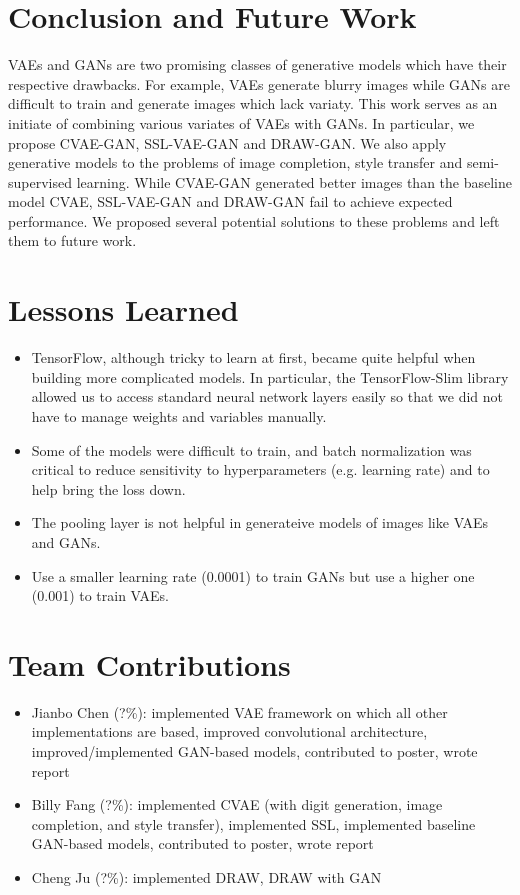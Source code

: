 \documentclass[10pt]{article}
\begin{document}
\section{Conclusion and Future Work}
VAEs and GANs are two promising classes of generative models which have their respective drawbacks. For example, VAEs generate blurry images while GANs are difficult to train and generate images which lack variaty. This work serves as an initiate of combining various variates of VAEs with GANs. In particular, we propose CVAE-GAN, SSL-VAE-GAN and DRAW-GAN. We also apply generative models to the problems of image completion, style transfer and semi-supervised learning. While CVAE-GAN generated better images than the baseline model CVAE, SSL-VAE-GAN and DRAW-GAN fail to achieve expected performance. We proposed several potential solutions to these problems and left them to future work.  
\section{Lessons Learned}
\begin{itemize}
\item TensorFlow, although tricky to learn at first, became quite helpful when building more complicated models. In particular, the TensorFlow-Slim library allowed us to access standard neural network layers easily so that we did not have to manage weights and variables manually.

\item Some of the models were difficult to train, and batch normalization was critical to reduce sensitivity to hyperparameters (e.g. learning rate) and to help bring the loss down.
\item The pooling layer is not helpful in generateive models of images like VAEs and GANs. 
\item Use a smaller learning rate (0.0001) to train GANs but use a higher one (0.001) to train VAEs. 
\end{itemize}
\section{Team Contributions}

\begin{itemize}
\item Jianbo Chen (?\%): implemented VAE framework on which all other implementations are based, improved convolutional architecture, improved/implemented GAN-based models, contributed to poster, wrote report
\item Billy Fang (?\%): implemented CVAE (with digit generation, image completion, and style transfer), implemented SSL, implemented baseline GAN-based models, contributed to poster, wrote report
\item Cheng Ju (?\%): implemented DRAW, DRAW with GAN
\end{itemize}















\nocite{*}
\end{document}
